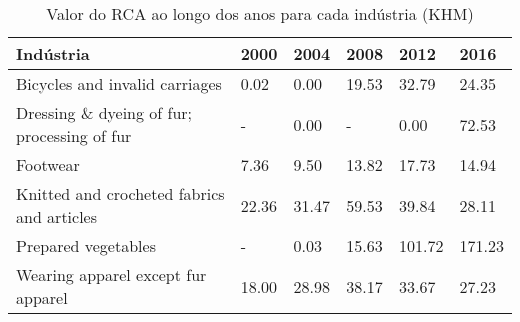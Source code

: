 \begin{table}
\centering
\caption{Valor do RCA ao longo dos anos para cada indústria (KHM)}
\label{tab:ex3-tempo-KHM}
\begin{tabular}{p{6cm}p{1.5cm}p{1.5cm}p{1.5cm}p{1.5cm}p{1.5cm}}
\toprule
                                  Indústria &  2000 &  2004 &  2008 &   2012 &   2016 \\
\midrule
             Bicycles and invalid carriages &  0.02 &  0.00 & 19.53 &  32.79 &  24.35 \\
Dressing \& dyeing of fur; processing of fur &     - &  0.00 &     - &   0.00 &  72.53 \\
                                   Footwear &  7.36 &  9.50 & 13.82 &  17.73 &  14.94 \\
 Knitted and crocheted fabrics and articles & 22.36 & 31.47 & 59.53 &  39.84 &  28.11 \\
                        Prepared vegetables &     - &  0.03 & 15.63 & 101.72 & 171.23 \\
         Wearing apparel except fur apparel & 18.00 & 28.98 & 38.17 &  33.67 &  27.23 \\
\bottomrule
\end{tabular}
\end{table}
